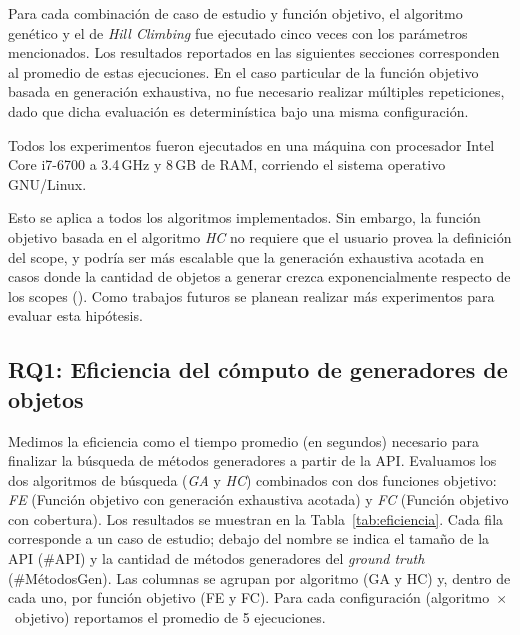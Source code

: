 Para cada combinación de caso de estudio y función objetivo, el algoritmo
genético y el de \emph{Hill Climbing} fue ejecutado cinco veces con los parámetros mencionados. Los
resultados reportados en las siguientes secciones corresponden al promedio de
estas ejecuciones. En el caso particular de la función objetivo basada en
generación exhaustiva, no fue necesario realizar múltiples repeticiones, dado
que dicha evaluación es determinística bajo una misma configuración.

Todos los experimentos fueron ejecutados en una máquina con procesador Intel
Core i7-6700 a 3.4\,GHz y 8\,GB de RAM, corriendo el sistema operativo
GNU/Linux.


%

Esto se aplica a todos los algoritmos implementados.
Sin embargo, la función objetivo basada en el algoritmo \emph{HC} no requiere que el usuario provea la definición del scope, y
podría ser más escalable que la generación exhaustiva acotada en casos donde
la cantidad de objetos a generar crezca exponencialmente respecto de los scopes 
(). Como trabajos futuros se planean realizar más experimentos 
para evaluar esta hipótesis.


\subsection{RQ1: Eficiencia del cómputo de generadores de objetos}
Medimos la eficiencia como el tiempo promedio (en segundos) necesario para
finalizar la búsqueda de métodos generadores a partir de la API. Evaluamos los dos
algoritmos de búsqueda (\emph{GA} y \emph{HC}) combinados con dos funciones
objetivo: \emph{FE} (Función objetivo con generación exhaustiva acotada) y \emph{FC} (Función objetivo con cobertura). 
Los resultados se muestran en la Tabla~\ref{tab:eficiencia}. Cada fila
corresponde a un caso de estudio; debajo del nombre se indica el tamaño de la API
(\#API) y la cantidad de métodos generadores del \emph{ground truth}
(\#MétodosGen). Las columnas se agrupan por algoritmo (GA y HC) y, dentro de
cada uno, por función objetivo (FE y FC). Para cada configuración
(algoritmo~$\times$~objetivo) reportamos el promedio de 5 ejecuciones.


